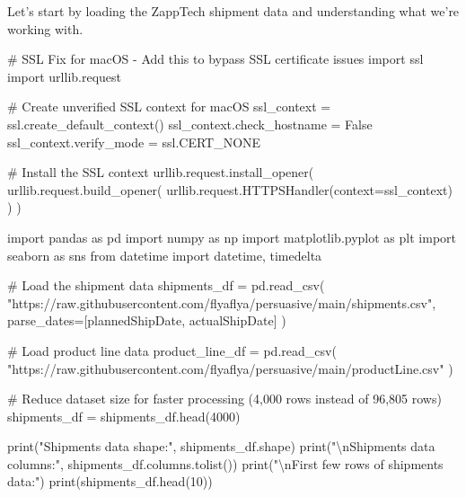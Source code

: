 \documentclass[
  letterpaper,
  DIV=11,
  numbers=noendperiod]{scrartcl}
\newenvironment{Shaded}{\begin{snugshade}}{\end{snugshade}}
\newcommand{\BuiltInTok}[1]{\textcolor[rgb]{0.00,0.23,0.31}{#1}}
\newcommand{\CharTok}[1]{\textcolor[rgb]{0.13,0.47,0.30}{#1}}
\newcommand{\CommentTok}[1]{\textcolor[rgb]{0.37,0.37,0.37}{#1}}
\newcommand{\DecValTok}[1]{\textcolor[rgb]{0.68,0.00,0.00}{#1}}
\newcommand{\ImportTok}[1]{\textcolor[rgb]{0.00,0.46,0.62}{#1}}
\newcommand{\NormalTok}[1]{\textcolor[rgb]{0.00,0.23,0.31}{#1}}
\newcommand{\OperatorTok}[1]{\textcolor[rgb]{0.37,0.37,0.37}{#1}}
\newcommand{\StringTok}[1]{\textcolor[rgb]{0.13,0.47,0.30}{#1}}
\newcommand{\VariableTok}[1]{\textcolor[rgb]{0.07,0.07,0.07}{#1}}
\begin{document}
Let's start by loading the ZappTech shipment data and understanding what
we're working with.

\label{load-data}
\begin{Shaded}
\begin{Highlighting}[]
\CommentTok{\# SSL Fix for macOS {-} Add this to bypass SSL certificate issues}
\ImportTok{import}\NormalTok{ ssl}
\ImportTok{import}\NormalTok{ urllib.request}

\CommentTok{\# Create unverified SSL context for macOS}
\NormalTok{ssl\_context }\OperatorTok{=}\NormalTok{ ssl.create\_default\_context()}
\NormalTok{ssl\_context.check\_hostname }\OperatorTok{=} \VariableTok{False}
\NormalTok{ssl\_context.verify\_mode }\OperatorTok{=}\NormalTok{ ssl.CERT\_NONE}

\CommentTok{\# Install the SSL context}
\NormalTok{urllib.request.install\_opener(}
\NormalTok{    urllib.request.build\_opener(}
\NormalTok{        urllib.request.HTTPSHandler(context}\OperatorTok{=}\NormalTok{ssl\_context)}
\NormalTok{    )}
\NormalTok{)}

\ImportTok{import}\NormalTok{ pandas }\ImportTok{as}\NormalTok{ pd}
\ImportTok{import}\NormalTok{ numpy }\ImportTok{as}\NormalTok{ np}
\ImportTok{import}\NormalTok{ matplotlib.pyplot }\ImportTok{as}\NormalTok{ plt}
\ImportTok{import}\NormalTok{ seaborn }\ImportTok{as}\NormalTok{ sns}
\ImportTok{from}\NormalTok{ datetime }\ImportTok{import}\NormalTok{ datetime, timedelta}

\CommentTok{\# Load the shipment data}
\NormalTok{shipments\_df }\OperatorTok{=}\NormalTok{ pd.read\_csv(}
    \StringTok{"https://raw.githubusercontent.com/flyaflya/persuasive/main/shipments.csv"}\NormalTok{, }
\NormalTok{    parse\_dates}\OperatorTok{=}\NormalTok{[}\StringTok{\textquotesingle{}plannedShipDate\textquotesingle{}}\NormalTok{, }\StringTok{\textquotesingle{}actualShipDate\textquotesingle{}}\NormalTok{]}
\NormalTok{)}

\CommentTok{\# Load product line data}
\NormalTok{product\_line\_df }\OperatorTok{=}\NormalTok{ pd.read\_csv(}
    \StringTok{"https://raw.githubusercontent.com/flyaflya/persuasive/main/productLine.csv"}
\NormalTok{)}

\CommentTok{\# Reduce dataset size for faster processing (4,000 rows instead of 96,805 rows)}
\NormalTok{shipments\_df }\OperatorTok{=}\NormalTok{ shipments\_df.head(}\DecValTok{4000}\NormalTok{)}

\BuiltInTok{print}\NormalTok{(}\StringTok{"Shipments data shape:"}\NormalTok{, shipments\_df.shape)}
\BuiltInTok{print}\NormalTok{(}\StringTok{"}\CharTok{\textbackslash{}n}\StringTok{Shipments data columns:"}\NormalTok{, shipments\_df.columns.tolist())}
\BuiltInTok{print}\NormalTok{(}\StringTok{"}\CharTok{\textbackslash{}n}\StringTok{First few rows of shipments data:"}\NormalTok{)}
\BuiltInTok{print}\NormalTok{(shipments\_df.head(}\DecValTok{10}\NormalTok{))}


\end{Highlighting}
\end{Shaded}
\end{document}
